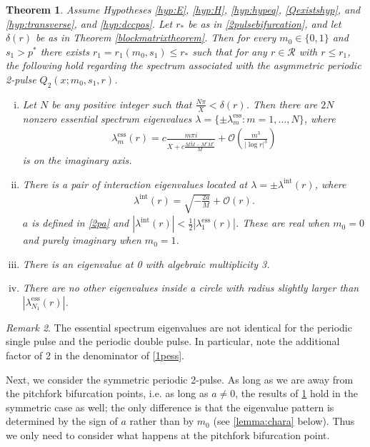 \documentclass[10pt,reqno]{amsart}
\theoremstyle{plain}
\newtheorem{theorem}{Theorem}
\theoremstyle{definition}
\theoremstyle{remark}
\newtheorem{remark}[theorem]{Remark}
\numberwithin{theorem}{section}
\numberwithin{equation}{section}
\begin{document}
\begin{theorem}\label{theorem:2peigsassym}
Assume Hypotheses \ref{hyp:E}, \ref{hyp:H}, \ref{hyp:hypeq}, \ref{Qexistshyp}, and \ref{hyp:transverse}, and \ref{hyp:dccpos}. Let $r_*$ be as in \cref{2pulsebifurcation}, and let $\delta(r)$ be as in Theorem \ref{blockmatrixtheorem}. Then for every $m_0 \in \{0, 1\}$ and $s_1 > p^*$ there exists $r_1 = r_1(m_0, s_1) \leq r_*$ such that for any $r \in \mathcal{R}$ with $r \leq r_1$, the following hold regarding the spectrum associated with the asymmetric periodic 2-pulse $Q_2(x; m_0, s_1, r)$.

\begin{enumerate}[(i)]
\item Let $N$ be any positive integer such that $\frac{N \pi}{X} < \delta(r)$. Then there are $2N$ nonzero essential spectrum eigenvalues $\lambda = \{ \pm \lambda_m^{\text{ess}} : m = 1, \dots, N \}$, where
\begin{align}\label{2pess}
\lambda_m^{\text{ess}}(r) = c \frac{m \pi i}{X + c \frac{M\tilde{M} - M^c\tilde{M^c}}{M}} +  \mathcal{O}\left( \frac{m^3}{|\log r|^3} \right)
\end{align}
is on the imaginary axis.

\item There is a pair of interaction eigenvalues located at $\lambda = \pm \lambda^{\text{int}}(r)$, where
\begin{align*}
\lambda^{\text{int}}(r) = \sqrt{-\frac{2a}{M}} + \mathcal{O}\left( r \right).
\end{align*}
$a$ is defined in \cref{2pa} and $|\lambda^{\text{int}}(r)| < \frac{1}{2}|\lambda_1^{\text{ess}}(r)|$. These are real when $m_0 = 0$ and purely imaginary when $m_0 = 1$.
\item There is an eigenvalue at 0 with algebraic multiplicity 3. 
\item There are no other eigenvalues inside a circle with radius slightly larger than $|\lambda_{N_1}^{\text{ess}}(r)|$.
\end{enumerate}
\end{theorem}

\begin{remark}The essential spectrum eigenvalues are not identical for the periodic single pulse and the periodic double pulse. In particular, note the additional factor of 2 in the denominator of \cref{1pess}.
\end{remark}

Next, we consider the symmetric periodic 2-pulse. As long as we are away from the pitchfork bifurcation points, i.e. as long as $a \neq 0$, the results of \cref{theorem:2peigsassym} hold in the symmetric case as well; the only difference is that the eigenvalue pattern is determined by the sign of $a$ rather than by $m_0$ (see \cref{lemma:chara} below). Thus we only need to consider what happens at the pitchfork bifurcation point.
\end{document}
